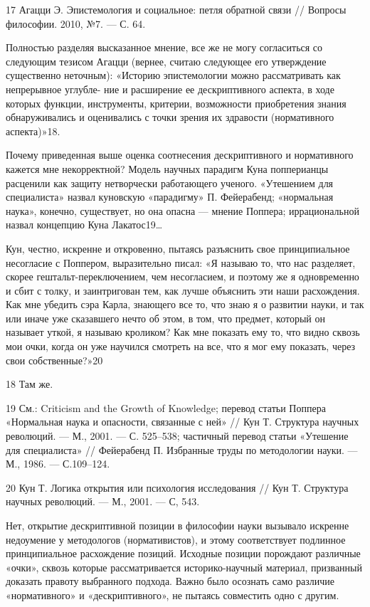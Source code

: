 \documentclass[11pt,a4paper]{article}
\begin{document}
17 Агацци Э. Эпистемология и социальное: петля обратной связи // Вопросы
философии. 2010, №7. — С. 64.

Полностью разделяя высказанное мнение, все же не могу согласиться со следующим
тезисом Агацци (вернее, считаю следующее его утверждение существенно
неточным): «Историю эпистемологии можно рассматривать как непрерывное углубле-
ние и расширение ее дескриптивного аспекта, в ходе которых функции,
инструменты, критерии, возможности приобретения знания обнаруживались и
оценивались с точки зрения их здравости (нормативного аспекта)»18.

Почему приведенная выше оценка соотнесения дескриптивного и нормативного
кажется мне некорректной? Модель научных парадигм Куна попперианцы расценили
как защиту нетворчески работающего ученого. «Утешением для специалиста»
назвал куновскую «парадигму» П. Фейерабенд; «нормальная наука», конечно,
существует, но она опасна — мнение Поппера; иррациональной назвал концепцию
Куна Лакатос19…

Кун, честно, искренне и откровенно, пытаясь разъяснить свое принципиальное
несогласие с Поппером, выразительно писал: «Я называю то, что нас разделяет,
скорее гештальт-переключением, чем несогласием, и поэтому же я одновременно
и сбит с толку, и заинтригован тем, как лучше объяснить эти наши
расхождения. Как мне убедить сэра Карла, знающего все то, что знаю я о
развитии науки, и так или иначе уже сказавшего нечто об этом, в том, что
предмет, который он называет уткой, я называю кроликом? Как мне показать ему
то, что видно сквозь мои очки, когда он уже научился смотреть на все, что я
мог ему показать, через свои собственные?»20

18 Там же.

19 См.: Criticism and the Growth of Knowledge; перевод статьи Поппера
«Нормальная наука и опасности, связанные с ней» // Кун Т. Структура научных
революций. — М., 2001. — С. 525–538; частичный перевод статьи «Утешение для
специалиста» // Фейерабенд П. Избранные труды по методологии науки. — М.,
1986. — С.109–124.

20 Кун Т. Логика открытия или психология исследования // Кун Т.  Структура
научных революций. — М., 2001. — С, 543.

Нет, открытие дескриптивной позиции в философии науки вызывало искренне
недоумение у методологов (нормативистов), и этому соответствует подлинное
принципиальное расхождение позиций. Исходные позиции порождают различные
«очки», сквозь которые рассматривается историко-научный материал,
призванный доказать правоту выбранного подхода. Важно было осознать само
различие «нормативного» и «дескриптивного», не пытаясь совместить одно с
другим.
\end{document}
